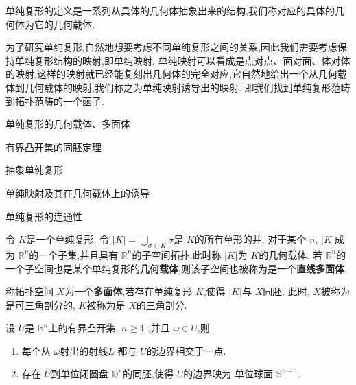 \documentclass[../../几何与拓扑.tex]{subfiles}
\begin{document}
单纯复形的定义是一系列从具体的几何体抽象出来的结构,我们称对应的具体的几何体为它的几何载体.

为了研究单纯复形,自然地想要考虑不同单纯复形之间的关系,因此我们需要考虑保持单纯复形结构的映射,即单纯映射.
单纯映射可以看成是点对点、面对面、体对体的映射,这样的映射就已经能复刻出几何体的完全对应,它自然地给出一个从几何载体到几何载体的映射,我们称之为单纯映射诱导出的映射.
即我们找到单纯复形范畴到拓扑范畴的一个函子.




\begin{introduction}
    \item 单纯复形的几何载体、多面体
    \item 有界凸开集的同胚定理
    \item 抽象单纯复形
    \item 单纯映射及其在几何载体上的诱导
    \item 单纯复形的连通性
\end{introduction}

\begin{definition}
    令 \(  K  \)是一个单纯复形. 令 \(  \left| K \right| =  \bigcup_{ \sigma  \in K} \sigma     \)是 \(  K  \)的所有单形的并.
    对于某个 \(  n  \), \(  \left| K \right|   \)成为 \(  \mathbb{R} ^{n}  \)的一个子集,并且具有 \(  \mathbb{R} ^{n}  \)的子空间拓扑.此时称 \(  \left| K \right|   \)为 \(  K  \)的几何载体.
    若 \(  \mathbb{R} ^{n}  \)的一个子空间也是某个单纯复形的\textbf{几何载体},则该子空间也被称为是一个\textbf{直线多面体}.           
\end{definition}


\begin{definition}
    称拓扑空间 \(  X  \)为一个\textbf{多面体},若存在单纯复形 \(  K  \),使得 \(  \left| K \right|   \)与 \(  X  \)同胚.    
    此时, \(  X  \)被称为是可三角剖分的, \(  K  \)被称为是 \(  X  \)的三角剖分.   
\end{definition}

\hspace*{\fill} 


\begin{proposition}
    设 \(  U  \)是 \(  \mathbb{R} ^{n}  \)上的有界凸开集, \(  n\ge 1  \)  ,并且 \(   \omega  \in U  \),则
    \begin{enumerate}
        \item 每个从 \(   \omega   \)射出的射线\(  L  \) 都与 \(  U  \)的边界相交于一点.
        \item 存在 \(  \overline{U}  \)到单位闭圆盘 \(  \mathbb{D}^{n}  \)的同胚,使得 \(  U  \)的边界映为 单位球面 \(  \mathbb{S}^{n-1}  \).      
    \end{enumerate}
      
\end{proposition}
\end{document}
